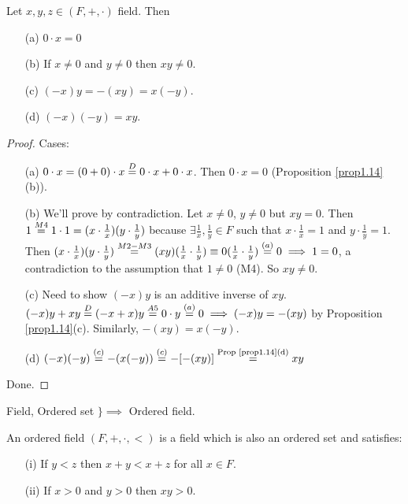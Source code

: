 \documentclass[]{article}
\begin{document}
\begin{proposition}
	\label{prop1.16}
	Let $x,y,z\in (F,+,\cdot)$ field. Then
	\begin{enumerate}
		\item[(a)] $0\cdot x = 0$
		\item[(b)] If $x\neq 0$ and $y\neq 0$ then $xy\neq 0$.
		\item[(c)] $(-x)y = -(xy) = x(-y)$.
		\item[(d)] $(-x)(-y) = xy$.
	\end{enumerate}
\end{proposition}
\begin{proof}
	Cases:
	\begin{enumerate}
		\item[(a)] $0\cdot x = (0+0)\cdot x \overset{D}{=} 0\cdot x + 0\cdot x$. Then $0\cdot x = 0$ (Proposition \ref{prop1.14}(b)).
		\item[(b)] We'll prove by contradiction. Let $x\neq 0$, $y\neq 0$ but $xy=0$. Then $1 \overset{M4}{=} 1\cdot 1 = (x\cdot \frac{1}{x})(y\cdot \frac{1}{y})$ because $\exists \frac{1}{x},\frac{1}{y}\in F$ such that $x\cdot \frac{1}{x} = 1$ and $y\cdot \frac{1}{y} = 1$. Then $(x\cdot \frac{1}{x})(y\cdot \frac{1}{y}) \overset{M2-M3}{=} (xy)(\frac{1}{x}\cdot\frac{1}{y}) \equiv 0(\frac{1}{x}\cdot\frac{1}{y}) \overset{(a)}{=} 0 \implies 1 =0$, a contradiction to the assumption that $1\neq 0$ (M4). So $xy\neq 0$.
		\item[(c)] Need to show $(-x)y$ is an additive inverse of $xy$. $(-x)y + xy \overset{D}{=} (-x+x)y \overset{A5}{=} 0\cdot y \overset{(a)}{=} 0 \implies (-x)y = -(xy)$ by Proposition \ref{prop1.14}(c). Similarly, $-(xy) = x(-y)$.
		\item[(d)] $(-x)(-y) \overset{(c)}{=} -(x(-y)) \overset{(c)}{=} -[-(xy)] \overset{\text{Prop \ref{prop1.14}(d)}}{=} xy$
	\end{enumerate}
	Done.
\end{proof}

Field, Ordered set $\}\implies$ Ordered field.

\begin{definition}
	An ordered field $(F,+,\cdot,<)$ is a field which is also an ordered set and satisfies:
	\begin{enumerate}
		\item[(i)] If $y<z$ then $x+y<x+z$ for all $x\in F$.
		\item[(ii)] If $x>0$ and $y>0$ then $xy>0$.
	\end{enumerate}
\end{definition}
\end{document}
